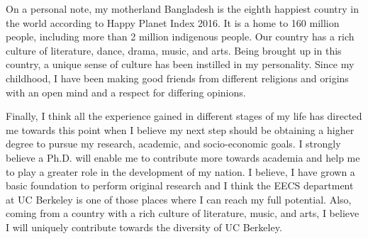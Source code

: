 \documentclass[12pt]{article}
\begin{document}
On a personal note, my motherland Bangladesh is the eighth happiest country in the world according to Happy Planet Index 2016. It is a home to 160 million people, including more than 2 million indigenous people. Our country has a rich culture of literature, dance, drama, music, and arts. Being brought up in this country, a unique sense of culture has been instilled in my personality. Since my childhood, I have been making good friends from different religions and origins with an open mind and a respect for differing opinions. 

Finally, I think all the experience gained in different stages of my life has directed me towards this point when I believe my next step should be obtaining a higher degree to pursue my research, academic, and socio-economic goals. I strongly believe a Ph.D. will enable me to contribute more towards academia and help me to play a greater role in the development of my nation. I believe, I have grown a basic foundation to perform original research and I think the EECS department at UC Berkeley is one of those places where I can reach my full potential. Also, coming from a country with a rich culture of literature, music, and arts, I believe I will uniquely contribute towards the diversity of UC Berkeley.
\end{document}

